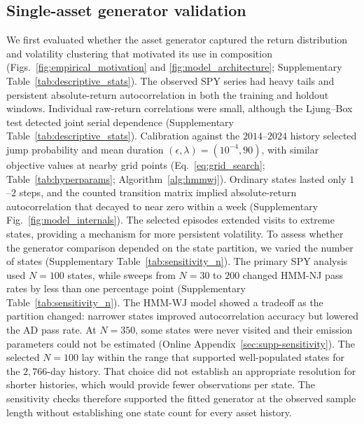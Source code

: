 \subsection{Single-asset generator validation}

We first evaluated whether the asset generator captured the return
distribution and volatility clustering that motivated its use in
composition (Figs.~\ref{fig:empirical_motivation} and
\ref{fig:model_architecture}; Supplementary Table~\ref{tab:descriptive_stats}). The observed SPY series had heavy tails
and persistent absolute-return autocorrelation in both the training
and holdout windows. Individual raw-return correlations were small,
although the Ljung--Box test detected joint serial dependence
(Supplementary Table~\ref{tab:descriptive_stats}). Calibration against the
$2014$--$2024$ history selected jump probability and mean duration
$(\epsilon,\lambda)=(10^{-4},90)$, with similar objective values at
nearby grid points (Eq.~\eqref{eq:grid_search};
Table~\ref{tab:hyperparams}; Algorithm~\ref{alg:hmmwj}). Ordinary
states lasted only $1$--$2$ steps, and the counted transition matrix
implied absolute-return autocorrelation that decayed to near zero
within a week (Supplementary Fig.~\ref{fig:model_internals}). The selected episodes
extended visits to extreme states, providing a mechanism for more
persistent volatility.
To assess whether the generator comparison depended on the state
partition, we varied the number of states
(Supplementary Table~\ref{tab:sensitivity_n}). The primary SPY analysis used $N=100$ states, while
sweeps from $N=30$ to $200$ changed HMM-NJ pass rates by less than
one percentage point (Supplementary Table~\ref{tab:sensitivity_n}). The HMM-WJ
model showed a tradeoff as the partition changed: narrower states
improved autocorrelation accuracy but lowered the AD pass rate.
At $N=350$, some states were never visited and their emission
parameters could not be estimated
(Online Appendix~\ref{sec:supp-sensitivity}). The selected
$N=100$ lay within the range that supported well-populated states
for the $2{,}766$-day history. That choice did not establish an
appropriate resolution for shorter histories, which would provide
fewer observations per state. The sensitivity checks therefore
supported the fitted generator at the observed sample length without
establishing one state count for every asset history.



